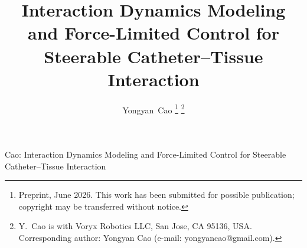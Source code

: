 \documentclass[journal]{IEEEtran}
\begin{document}
\title{Interaction Dynamics Modeling and Force-Limited Control for Steerable Catheter--Tissue Interaction}

\author{Yongyan~Cao%
\thanks{Preprint, June 2026. This work has been submitted for possible publication; copyright may be transferred without notice.}%
\thanks{Y.~Cao is with Voryx Robotics LLC, San Jose, CA 95136, USA. Corresponding author: Yongyan Cao (e-mail: yongyancao@gmail.com).}%
}

%
{Cao: Interaction Dynamics Modeling and Force-Limited Control for Steerable Catheter--Tissue Interaction}

\maketitle



\balance
\end{document}
